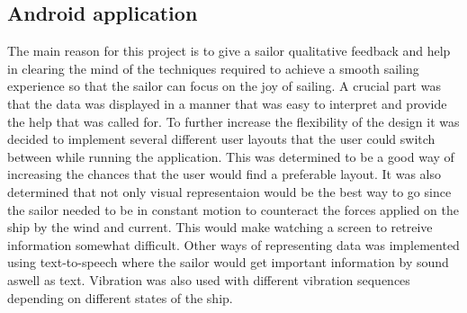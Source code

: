 \subsection{Android application}
The main reason for this project is to give a sailor qualitative feedback and help in clearing the mind of the techniques required to achieve a smooth sailing experience so that the sailor can focus on the joy of sailing. A crucial part was that the data was displayed in a manner that was easy to interpret and provide the help that was called for. To further increase the flexibility of the design it was decided to implement several different user layouts that the user could switch between while running the application. This was determined to be a good way of increasing the chances that the user would find a preferable layout. It was also determined that not only visual representaion would be the best way to go since the sailor needed to be in constant motion to counteract the forces applied on the ship by the wind and current. This would make watching a screen to retreive information somewhat difficult. Other ways of representing data was implemented using text-to-speech where the sailor would get important information by sound aswell as text. Vibration was also used with different vibration sequences depending on different states of the ship.

